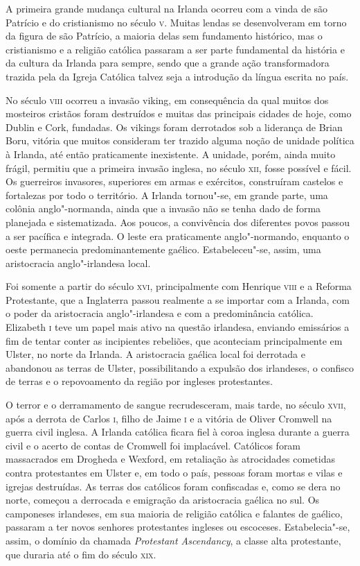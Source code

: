 A primeira grande mudança cultural na Irlanda ocorreu com a vinda de são
Patrício e do cristianismo no século \textsc{v}. Muitas lendas se desenvolveram
em torno da figura de são Patrício, a maioria delas sem fundamento
histórico, mas o cristianismo e a religião católica passaram a ser
parte fundamental da história e da cultura da Irlanda para sempre,
sendo que a grande ação transformadora trazida pela da Igreja Católica
talvez seja a introdução da língua escrita no país. 

 No século \textsc{viii} ocorreu a invasão viking, em consequência da qual muitos
dos mosteiros cristãos foram destruídos e muitas das principais cidades
de hoje, como Dublin e Cork, fundadas. Os vikings foram derrotados sob
a liderança de Brian Boru, vitória que muitos consideram ter trazido
alguma noção de unidade política à Irlanda, até então praticamente
inexistente. A unidade, porém, ainda muito frágil, permitiu que a
primeira invasão inglesa, no século \textsc{xii}, fosse possível e fácil. Os
guerreiros invasores, superiores em armas e exércitos, construíram
castelos e fortalezas por todo o território. A Irlanda tornou"-se, em
grande parte, uma colônia anglo"-normanda, ainda que a invasão não se
tenha dado de forma planejada e sistematizada. Aos poucos, a
convivência dos diferentes povos passou a ser pacífica e integrada. O
leste era praticamente anglo"-normando, enquanto o oeste permanecia
predominantemente gaélico. Estabeleceu"-se, assim, uma aristocracia
anglo"-irlandesa local.

Foi somente a partir do século \textsc{xvi}, principalmente com Henrique \textsc{viii} e a
Reforma Protestante, que a Inglaterra passou realmente a se importar
com a Irlanda, com o poder da aristocracia anglo"-irlandesa e com a
predominância católica. Elizabeth \textsc{i} teve um papel mais ativo na questão
irlandesa, enviando emissários a fim de tentar conter as incipientes
rebeliões, que aconteciam principalmente em Ulster, no norte da
Irlanda. A aristocracia gaélica local foi derrotada e abandonou as
terras de Ulster, possibilitando a expulsão dos irlandeses, o confisco
de terras e o repovoamento da região por ingleses protestantes.

O terror e o derramamento de sangue recrudesceram, mais tarde, no século
\textsc{xvii}, após a derrota de Carlos \textsc{i}, filho de Jaime \textsc{i} e a vitória de
Oliver Cromwell na guerra civil inglesa. A Irlanda católica ficara fiel
à coroa inglesa durante a guerra civil e o acerto de contas de Cromwell
foi implacável. Católicos foram massacrados em Drogheda e Wexford, em
retaliação às atrocidades cometidas contra protestantes em Ulster e, em
todo o país, pessoas foram mortas e vilas e igrejas destruídas. As
terras dos católicos foram confiscadas e, como se dera no norte,
começou a derrocada e emigração da aristocracia gaélica no sul. Os
camponeses irlandeses, em sua maioria de religião católica e falantes
de gaélico, passaram a ter novos senhores protestantes ingleses ou
escoceses. Estabelecia"-se, assim, o domínio da chamada
\textit{Protestant Ascendancy}, a classe alta protestante, que duraria
até o fim do século \textsc{xix}.  

